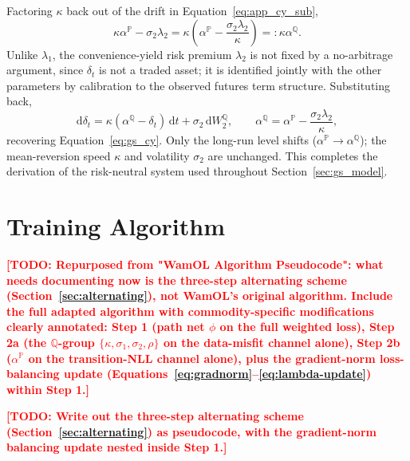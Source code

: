 \documentclass[11pt, a4paper]{article}
\newcommand{\todo}[1]{\textcolor{red}{\textbf{[TODO: #1]}}}
\newcommand{\convyield}{\delta}             %
\newcommand{\meanrev}{\kappa}               %
\newcommand{\longrun}{\alpha}               %
\begin{document}
Factoring $\meanrev$ back out of the drift in Equation~\ref{eq:app_cy_sub},
\begin{equation}
  \label{eq:app_alphaQ}
  \meanrev\longrun^{\mathbb{P}} - \sigma_2\lambda_2
  = \meanrev\!\left(\longrun^{\mathbb{P}} - \frac{\sigma_2\lambda_2}{\meanrev}\right)
  =: \meanrev\longrun^{\mathbb{Q}}.
\end{equation}
\noindent
Unlike $\lambda_1$, the convenience-yield risk premium $\lambda_2$ is not fixed by a no-arbitrage argument, since $\convyield_t$ is not a traded asset; it is identified jointly with the other parameters by calibration to the observed futures term structure. Substituting back,
\begin{equation}
  \label{eq:app_cy_Q}
  \mathrm{d}\convyield_t = \meanrev(\longrun^{\mathbb{Q}} - \convyield_t)\,\mathrm{d}t + \sigma_2\,\mathrm{d}W_2^{\mathbb{Q}},
  \qquad
  \longrun^{\mathbb{Q}} = \longrun^{\mathbb{P}} - \frac{\sigma_2\lambda_2}{\meanrev},
\end{equation}
\noindent
recovering Equation~\ref{eq:gs_cy}. Only the long-run level shifts ($\longrun^{\mathbb{P}} \to \longrun^{\mathbb{Q}}$); the mean-reversion speed $\meanrev$ and volatility $\sigma_2$ are unchanged. This completes the derivation of the risk-neutral system used throughout Section~\ref{sec:gs_model}.

\section{Training Algorithm}
\label{app:algorithm}

\todo{Repurposed from "WamOL Algorithm Pseudocode": what needs documenting now
  is the three-step alternating scheme (Section~\ref{sec:alternating}), not
  WamOL's original algorithm. Include the full adapted algorithm with
  commodity-specific modifications clearly annotated: Step 1 (path net $\phi$
  on the full weighted loss), Step 2a (the $\mathbb{Q}$-group
  $\{\kappa,\sigma_1,\sigma_2,\rho\}$ on the data-misfit channel alone), Step 2b
  ($\alpha^{\mathbb{P}}$ on the transition-NLL channel alone), plus the
  gradient-norm loss-balancing update (Equations~\ref{eq:gradnorm}--\ref{eq:lambda-update})
  within Step 1.}

\begin{algorithm}[H]
\caption{Alternating Optimisation for Gibson--Schwartz Convenience Yield Estimation}
\label{alg:wamol_gs}
\todo{Write out the three-step alternating scheme (Section~\ref{sec:alternating})
  as pseudocode, with the gradient-norm balancing update nested inside Step 1.}
\end{algorithm}
\end{document}
